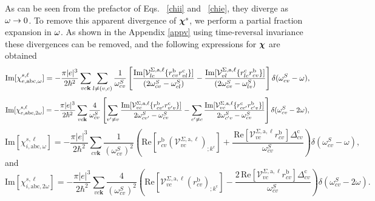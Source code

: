 \documentclass[floatfix,prb,aps,superscriptaddress,11pt,preprint]{revtex4}
\begin{document}
As can be seen from the prefactor of Eqs. ~\eqref{chii} and
~\eqref{chie}, they  
diverge as $\omega\to 0$. To remove this apparent  
divergence of $\boldsymbol{\chi}^s$, we perform 
a partial fraction  expansion in $\omega$. 
As shown in the Appendix \ref{appv} 
using time-reversal invariance these divergences can be removed, and
the following expressions for $\boldsymbol{\chi}$ are obtained  
\begin{equation}\label{calvimchiewn}
\mathrm{Im}[\chi_{e,\mathrm{a}\mathrm{b}\mathrm{c},\omega}^{s,\ell}] =
-\frac{\pi |e|^3}{2\hbar^2}\sum_{vc\mathbf{k}}\sum_{l\neq(v,c)}\frac{1}{\omega^{S}_{cv}}
\left[
\frac{\mathrm{Im}[\mathcal{V}^{\Sigma,\text{a},\ell}_{lc}\{r^{\mathrm{b}}_{cv}r^{\mathrm{c}}_{vl}\}]}
{(2\omega^S_{cv}-\omega^S_{cl})} 
-\frac{\mathrm{Im}[\mathcal{V}^{\Sigma,\text{a},\ell}_{vl}\{r^{\mathrm{c}}_{lc}r^{\mathrm{b}}_{cv}\}]}
{(2\omega^S_{cv}-\omega^S_{lv})}
\right]\delta(\omega^S_{cv}-\omega),
\end{equation}  
\begin{equation}\label{calvimchie2wn}
\mathrm{Im}[\chi_{e,\mathrm{a}\mathrm{b}\mathrm{c},2\omega}^{s,\ell}] =
-\frac{\pi |e|^3}{2\hbar^2}\sum_{vc\mathbf{k}}\frac{4}{\omega^{S}_{cv}}
\left[
\sum_{v'\ne
  v}\frac{\mathrm{Im}[\mathcal{V}^{\Sigma,\text{a},\ell}_{vc}\{r^{\mathrm{b}}_{cv'}r^{\mathrm{c}}_{v'v}\}]}
{2\omega^S_{cv'}-\omega^S_{cv}}
- \sum_{c'\ne
  c}\frac{\mathrm{Im}[\mathcal{V}^{\Sigma,\text{a},\ell}_{vc}\{r^{\mathrm{c}}_{cc'}r^{\mathrm{b}}_{c'v}\}]}
{2\omega^S_{c'v}-\omega^S_{cv}}
\right]\delta(\omega^S_{cv}-2\omega),
\end{equation}
\begin{equation}\label{calvimchiwn}
\mathrm{Im}[\chi_{i,\text{a}\text{b}\text{c},\omega}^{s,\ell}]
= -\frac{\pi\vert e\vert^3}{2\hbar^2}\sum_{cv\mathbf{k}}\frac{1}{(\omega^{S}_{cv})^{2}}
\left(
\mathrm{Re}\left[r^{\text{b}}_{cv}\left(\mathcal{V}^{\Sigma,\text{a},\ell}_{vc}\right)_{;k^{\text{c}}}\right]
+\frac{\,\mathrm{Re}\left[\mathcal{V}^{\Sigma,\text{a},\ell}_{vc}r^{\text{b}}_{cv}\right]
\Delta^{\text{c}}_{cv}}{\omega^{S}_{cv}} 
\right)\delta(\omega^{S}_{cv}-\omega),
\end{equation}
and
\begin{equation}\label{calvimchi2wn}
\mathrm{Im}[\chi_{i,\text{a}\text{b}\text{c},2\omega}^{s,\ell}] 
=
 -\frac{\pi \vert
   e\vert^{3}}{2\hbar^2}\sum_{vc\mathbf{k}}\frac{4}{(\omega^{S}_{cv})^{2}}
\left(\mathrm{Re}\left[\mathcal{V}^{\Sigma,\text{a},\ell}_{vc}\left(r^{\text{b}}_{cv}\right)_{;k^{\text{c}}}
\right] -
\frac{2\,\mathrm{Re}\left[\mathcal{V}^{\Sigma,\text{a},\ell}_{vc}r^{\text{b}}_{cv}\right]
\Delta^{\text{c}}_{cv}}{\omega^{S}_{cv}}\right)\delta(\omega^{S}_{cv}-2\omega).
\end{equation}
\end{document}
